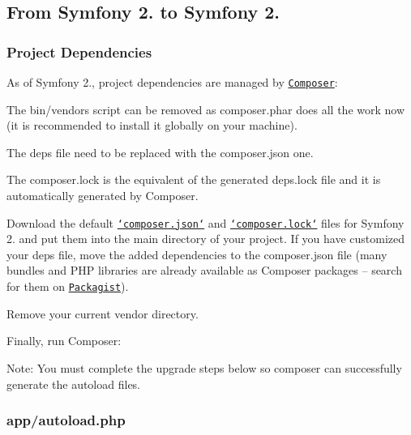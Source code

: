 \subsection*{From Symfony 2. to Symfony 2. }

\subsubsection*{Project Dependencies}

As of Symfony 2., project dependencies are managed by \href{http://getcomposer.org/}{\tt Composer}\+:


\begin{DoxyItemize}
\item The {\ttfamily bin/vendors} script can be removed as {\ttfamily composer.\+phar} does all the work now (it is recommended to install it globally on your machine).
\item The {\ttfamily deps} file need to be replaced with the {\ttfamily composer.\+json} one.
\item The {\ttfamily composer.\+lock} is the equivalent of the generated {\ttfamily deps.\+lock} file and it is automatically generated by Composer.
\end{DoxyItemize}

Download the default \href{https://raw.github.com/symfony/symfony-standard/2.1/composer.json}{\tt `composer.json`} and \href{https://raw.github.com/symfony/symfony-standard/2.1/composer.lock}{\tt `composer.lock`} files for Symfony 2. and put them into the main directory of your project. If you have customized your {\ttfamily deps} file, move the added dependencies to the {\ttfamily composer.\+json} file (many bundles and P\+H\+P libraries are already available as Composer packages -- search for them on \href{http://packagist.org/}{\tt Packagist}).

Remove your current {\ttfamily vendor} directory.

Finally, run Composer\+: 


Note\+: You must complete the upgrade steps below so composer can successfully generate the autoload files.

\subsubsection*{{\ttfamily app/autoload.\+php}}


